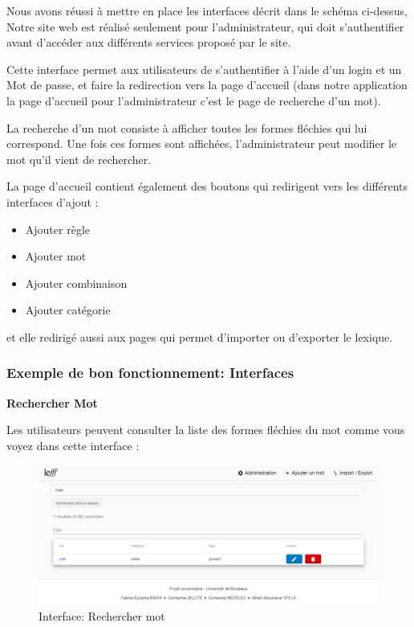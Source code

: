 \documentclass[12pt,a4paper]{article}
\begin{document}
Nous avons réussi à mettre en place les interfaces décrit dans le schéma ci-dessus,
Notre site web est réalisé seulement pour l'administrateur, qui doit s'authentifier
avant d'accéder aux différents services proposé par le site.

Cette interface permet aux utilisateurs de s'authentifier à l’aide d'un login et un Mot de passe, 
et faire la redirection vers la page d'accueil (dans notre application la page d'accueil
pour l'administrateur c'est le page de recherche d'un mot).

La recherche d'un mot consiste à afficher toutes les formes fléchies qui lui correspond. Une fois ces formes sont affichées, 
l'administrateur peut modifier le mot qu'il vient de rechercher.

La page d'accueil contient également des boutons qui redirigent vers les différents interfaces d'ajout : 
\begin{itemize}
    \item   Ajouter règle
    \item   Ajouter mot
    \item   Ajouter combinaison
    \item   Ajouter catégorie
   \end{itemize}
et elle redirigé aussi aux  pages qui permet d'importer ou d'exporter le lexique.

\newpage
\subsubsection{Exemple de bon fonctionnement: Interfaces} 

 
  \textbf{ Rechercher Mot }

Les utilisateurs peuvent consulter la liste des formes fléchies du mot comme vous voyez dans cette interface :


\begin{figure}[h]
\centering
\includegraphics[width=150mm]{img/Recherche.PNG}
\caption{Interface: Rechercher mot}
\label{Tux}
\end{figure}
\end{document}
